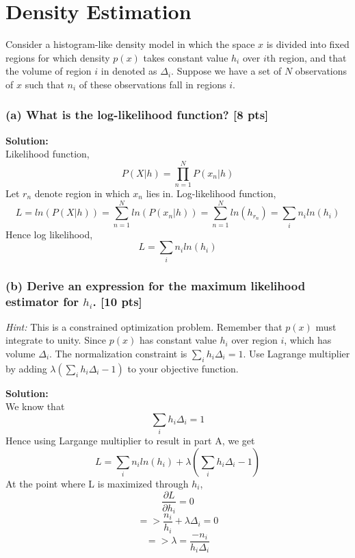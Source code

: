 \documentclass[twoside,10pt]{article}
\begin{document}
\section{Density Estimation}

Consider a histogram-like density model in which the space $x$ is
divided into fixed regions for which density $p(x)$ takes constant
value $h_i$ over $i$th region, and that the volume of region $i$ in
denoted as $\Delta_i$. Suppose we have a set of $N$ observations of
$x$ such that $n_i$ of these observations fall in regions $i$.

\subsubsection*{(a) What is the log-likelihood function? [8 pts]}
\textbf{ Solution: }\\

Likelihood function,
$$
P(X|h) = \prod_{n=1}^{N}{P(x_n|h)} 
$$
Let $r_n$ denote region in which $x_n$ lies in.
Log-likelihood function,
$$
L = ln(P(X|h)) = \sum_{n=1}^{N}{ln(P(x_n|h))} =   \sum_{n=1}^{N}{ln(h_{r_n})} = \sum_{i}{n_i ln(h_i)}
$$
Hence log likelihood,
$$
\boxed{L =\sum_{i}{n_i ln(h_i)} }
$$


\subsubsection*{(b) Derive an expression for the maximum likelihood estimator for {$h_i$}. [10 pts]}

\emph{Hint:} This is a constrained optimization problem. Remember that $p(x)$ must integrate to unity. Since
$p(x)$ has constant value $h_i$ over region $i$, which has volume
$\Delta_i$. The normalization constraint is $\sum_i h_i\Delta_i =
1$. Use Lagrange multiplier by adding
$\lambda\left(\sum_ih_i\Delta_i-1\right)$ to your objective function.

\textbf{ Solution: }\\
We know that 
$$
\sum_{i}{h_i \Delta_i} = 1
$$
Hence using Largange multiplier to result in part A, we get 
$$
L = \sum_{i}{n_i ln(h_i)} + \lambda({\sum_{i}{h_i \Delta_i - 1}})
$$
At the point where L is maximized through $h_i$,
$$
\frac{\partial L}{\partial h_i} = 0
$$
$$
=> \frac{n_i}{h_i} + \lambda\Delta_i = 0
$$
\begin{equation}
=> \lambda = \frac{-n_i}{h_i \Delta_i} \label{eq:lambda}
\end{equation}
\end{document}
